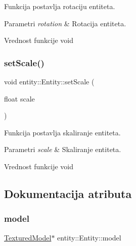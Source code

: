 Funkcija postavlja rotaciju entiteta. 


\begin{DoxyParams}{Parametri}
{\em rotation} & Rotacija entiteta. \\
\hline
\end{DoxyParams}
\begin{DoxyReturn}{Vrednost funkcije}
void 
\end{DoxyReturn}
\mbox{\label{classentity_1_1Entity_a5d2d7bd6cd754ce566e2d4a9e4b991e0}} 
\subsubsection{\texorpdfstring{set\+Scale()}{setScale()}}
{\footnotesize\ttfamily void entity\+::\+Entity\+::set\+Scale (\begin{DoxyParamCaption}\item[{float}]{scale }\end{DoxyParamCaption})}



Funkcija postavlja skaliranje entiteta. 


\begin{DoxyParams}{Parametri}
{\em scale} & Skaliranje entiteta. \\
\hline
\end{DoxyParams}
\begin{DoxyReturn}{Vrednost funkcije}
void 
\end{DoxyReturn}


\subsection{Dokumentacija atributa}
\mbox{\label{classentity_1_1Entity_ac7848c5d47d4b2bf12c84ddbbc32052a}} 
\subsubsection{\texorpdfstring{model}{model}}
{\footnotesize\ttfamily \hyperlink{classmodel_1_1TexturedModel}{Textured\+Model}$\ast$ entity\+::\+Entity\+::model\hspace{0.3cm}{\ttfamily [private]}}



